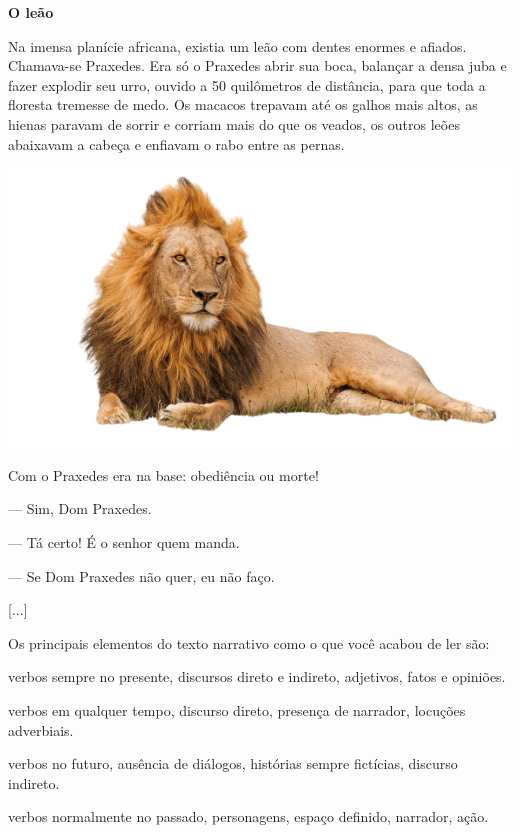 \begin{myquote}
\textbf{O leão}

Na imensa planície africana, existia um leão com dentes enormes e
afiados. Chamava-se Praxedes. Era só o Praxedes abrir sua boca, balançar
a densa juba e fazer explodir seu urro, ouvido a 50 quilômetros de
distância, para que toda a floresta tremesse de medo. Os macacos
trepavam até os galhos mais altos, as hienas paravam de sorrir e corriam
mais do que os veados, os outros leões abaixavam a cabeça e enfiavam o
rabo entre as pernas.

\begin{center}
\includegraphics[width=.8\textwidth]{./media/image23n.png}
\end{center}

Com o Praxedes era na base: obediência ou morte!

--- Sim, Dom Praxedes.

--- Tá certo! É o senhor quem manda.

--- Se Dom Praxedes não quer, eu não faço.

{[}...{]}

\end{myquote}

Os principais elementos do texto narrativo como o que você acabou de ler
são:

\begin{escolha}
\item verbos sempre no presente, discursos direto e indireto, adjetivos, fatos e opiniões.

\item verbos em qualquer tempo, discurso direto, presença de narrador, locuções adverbiais.

\item verbos no futuro, ausência de diálogos, histórias sempre fictícias, discurso indireto.

\item verbos normalmente no passado, personagens, espaço definido, narrador, ação.
\end{escolha}


